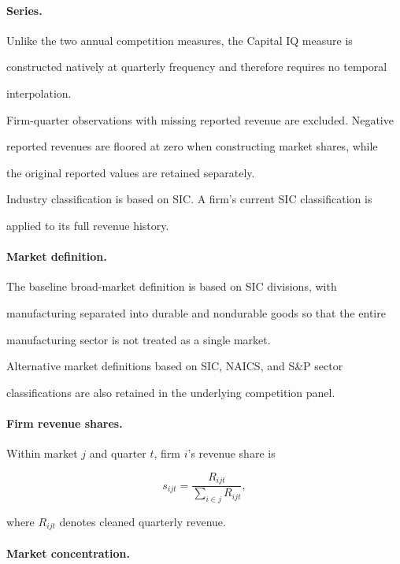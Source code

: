 \documentclass[11pt]{article}
\begin{document}
\paragraph{Series.}

Unlike the two annual competition measures, the Capital IQ measure is

constructed natively at quarterly frequency and therefore requires no temporal

interpolation.

Firm-quarter observations with missing reported revenue are excluded. Negative

reported revenues are floored at zero when constructing market shares, while

the original reported values are retained separately.

Industry classification is based on SIC. A firm's current SIC classification is

applied to its full revenue history.

\paragraph{Market definition.}

The baseline broad-market definition is based on SIC divisions, with

manufacturing separated into durable and nondurable goods so that the entire

manufacturing sector is not treated as a single market.

Alternative market definitions based on SIC, NAICS, and S\&P sector

classifications are also retained in the underlying competition panel.

\paragraph{Firm revenue shares.}

Within market $j$ and quarter $t$, firm $i$'s revenue share is

\begin{equation}
s_{ijt}
=
\frac{R_{ijt}}
{\sum_{i\in j}R_{ijt}},
\end{equation}

where $R_{ijt}$ denotes cleaned quarterly revenue.

\paragraph{Market concentration.}
\end{document}

